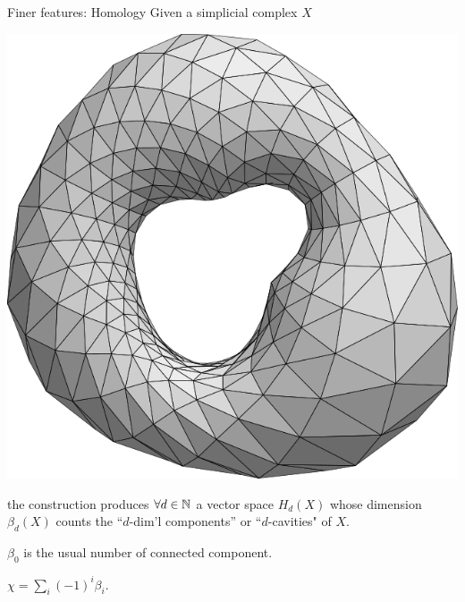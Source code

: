 \begin{frame}{Finer features: Homology}
	\pause
	Given a simplicial complex $X$
	\begin{center}
		\includegraphics[scale=.1]{aux/torus_triangulated}
	\end{center}
	the  construction produces $\forall d \in \mathbb{N}$ a vector space $H_d(X)$ whose dimension $\beta_d(X)$ counts the ``$d$-dim'l components'' or ``$d$-cavities" of $X$.

	\pause\bigskip
	 $\beta_0$ is the usual number of connected component.

	\pause\bigskip
	 $\chi = \sum_i (-1)^i \beta_i$.
\end{frame}

